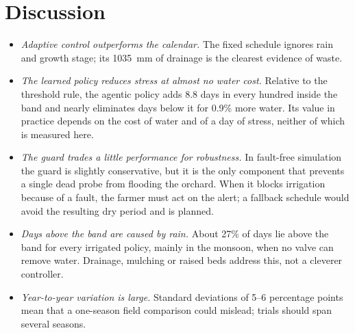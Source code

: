 \documentclass[conference]{IEEEtran}
\begin{document}
\section{Discussion}
\begin{itemize}
\item \textit{Adaptive control outperforms the calendar.} The fixed schedule ignores rain and growth stage; its 1035~mm of drainage is the clearest evidence of waste.
\item \textit{The learned policy reduces stress at almost no water cost.} Relative to the threshold rule, the agentic policy adds 8.8 days in every hundred inside the band and nearly eliminates days below it for 0.9\% more water. Its value in practice depends on the cost of water and of a day of stress, neither of which is measured here.
\item \textit{The guard trades a little performance for robustness.} In fault-free simulation the guard is slightly conservative, but it is the only component that prevents a single dead probe from flooding the orchard. When it blocks irrigation because of a fault, the farmer must act on the alert; a fallback schedule would avoid the resulting dry period and is planned.
\item \textit{Days above the band are caused by rain.} About 27\% of days lie above the band for every irrigated policy, mainly in the monsoon, when no valve can remove water. Drainage, mulching or raised beds address this, not a cleverer controller.
\item \textit{Year-to-year variation is large.} Standard deviations of 5--6 percentage points mean that a one-season field comparison could mislead; trials should span several seasons.
\end{itemize}
\end{document}
